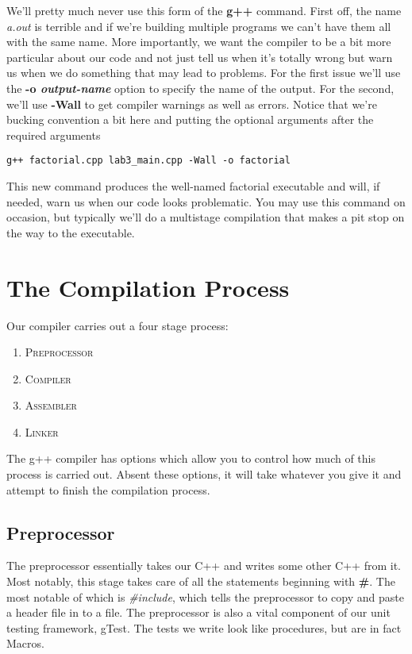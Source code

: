 \documentclass[]{tufte-handout}
\begin{document}
We'll pretty much never use this form of the \textbf{g++} command. First off, the name \textit{a.out} is terrible and if we're building multiple programs we can't have them all with the same name.  More importantly, we want the compiler to be a bit more particular about our code and not just tell us when it's totally wrong but warn us when we do something that may lead to problems. For the first issue we'll use the \textbf{-o \textit{output-name}} option to specify the name of the output. For the second, we'll use \textbf{-Wall} to get compiler warnings as well as errors. Notice that we're bucking convention a bit here and putting the optional arguments after the required arguments
\begin{verbatim}
g++ factorial.cpp lab3_main.cpp -Wall -o factorial
\end{verbatim}
This new command produces the well-named factorial executable and will, if needed, warn us when our code looks problematic.  You may use this command on occasion, but typically we'll do a multistage compilation that makes a pit stop on the way to the executable.

\section{The Compilation Process}

Our compiler carries out a four stage process:
\begin{enumerate}
\item \textsc{Preprocessor} 
\item \textsc{Compiler} 
\item \textsc{Assembler} 
\item \textsc{Linker} 
\end{enumerate}
The g++ compiler has options which allow you to control how much of this process is carried out.  Absent these options, it will take whatever you give it and attempt to finish the compilation process. 

\subsection{Preprocessor}

The preprocessor essentially takes our C++ and writes some other C++ from it. Most notably, this stage takes care of all the statements beginning with \textbf{\#}. The most notable of which is \textit{\#include}, which tells the preprocessor to copy and paste a header file in to a file. The preprocessor is also a vital component of our unit testing framework, gTest.  The tests we write look like procedures, but are in fact Macros.
\end{document}
